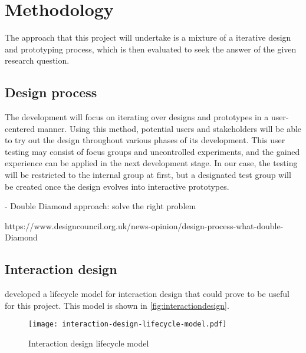 \chapter{Methodology}
\label{ch:methodology}

The approach that this project will undertake is a mixture of a iterative design and prototyping process, which is then evaluated to seek the answer of the given research question.

\section{Design process}
\label{sec:designprocess}

The development will focus on iterating over designs and prototypes in a user-centered manner. Using this method, potential users and stakeholders will be able to try out the design throughout various phases of its development. This user testing may consist of focus groups and uncontrolled experiments, and the gained experience can be applied in the next development stage. In our case, the testing will be restricted to the internal group at first, but a designated test group will be created once the design evolves into interactive prototypes.


- Double Diamond approach: solve the right problem

https://www.designcouncil.org.uk/news-opinion/design-process-what-double-Diamond


\section{Interaction design}
\label{sec:interactiondesign}

\textcite{preece2015} developed a lifecycle model for interaction design that could prove to be useful for this project. This model is shown in \autoref{fig:interactiondesign}.

\begin{figure}
    \centering
    \texttt{[image: interaction-design-lifecycle-model.pdf]}
    \caption{Interaction design lifecycle model}
    \label{fig:interactiondesign}
\end{figure}

